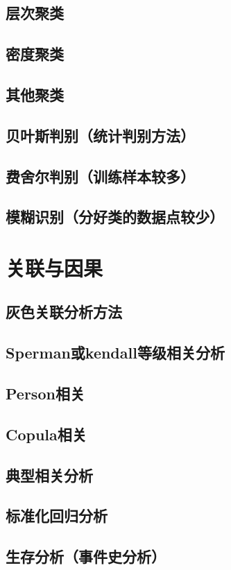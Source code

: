\documentclass[openany]{progbookcn}
\begin{document}
\section{层次聚类}
\section{密度聚类}
\section{其他聚类}
\section{贝叶斯判别（统计判别方法）}
\section{费舍尔判别（训练样本较多）}
\section{模糊识别（分好类的数据点较少）}
\chapter{关联与因果}
\section{灰色关联分析方法}
\section{Sperman或kendall等级相关分析}
\section{Person相关}
\section{Copula相关}
\section{典型相关分析}
\section{标准化回归分析}
\section{生存分析（事件史分析）}
\end{document}
